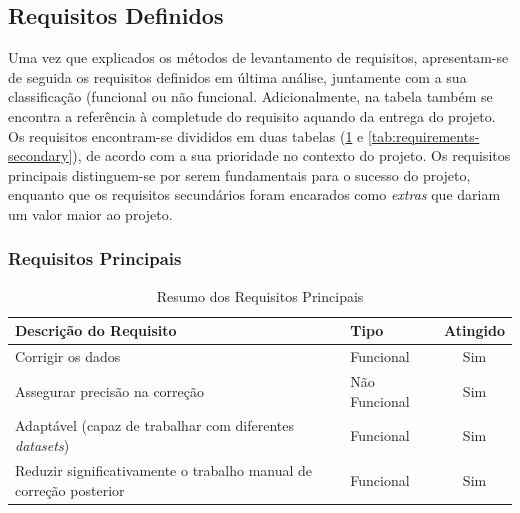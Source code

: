 \documentclass[a4paper,12pt]{article}
\begin{document}
\subsection{Requisitos Definidos}
Uma vez que explicados os métodos de levantamento de requisitos, apresentam-se de seguida os requisitos definidos em última análise, juntamente com a sua classificação (funcional ou não funcional. Adicionalmente, na tabela também se encontra a referência à completude do requisito aquando da entrega do projeto. Os requisitos encontram-se divididos em duas tabelas (\ref{tab:requirements} e \ref{tab:requirements-secondary}), de acordo com a sua prioridade no contexto do projeto. Os requisitos principais distinguem-se por serem fundamentais para o sucesso do projeto, enquanto que os requisitos secundários foram encarados como \textit{extras} que dariam um valor maior ao projeto.

\subsubsection{Requisitos Principais}
\begin{table}[h!]
    \centering
    \begin{tabularx}{\textwidth}{|X|l|c|}
        \hline
        \textbf{Descrição do Requisito} & \textbf{Tipo} & \textbf{Atingido} \\ \hline
        Corrigir os dados & Funcional & Sim \\ \hline
        Assegurar precisão na correção & Não Funcional & Sim \\ \hline
        Adaptável (capaz de trabalhar com diferentes \textit{datasets}) & Funcional & Sim\\ \hline
        Reduzir significativamente o trabalho manual de correção posterior & Funcional & Sim\\ \hline
    \end{tabularx}
    \caption{Resumo dos Requisitos Principais}
    \label{tab:requirements}
\end{table}
\end{document}
